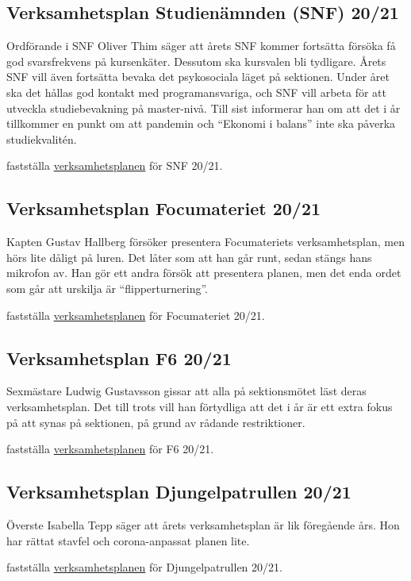 \documentclass[hidelinks]{sektionsmote}
\begin{document}
\subsection{Verksamhetsplan Studienämnden (SNF) 20/21}
Ordförande i SNF Oliver Thim säger att årets SNF kommer fortsätta försöka få god svarsfrekvens på kursenkäter.
Dessutom ska kursvalen bli tydligare.
Årets SNF vill även fortsätta bevaka det psykosociala läget på sektionen.
Under året ska det hållas god kontakt med programansvariga, och SNF vill arbeta för att utveckla studiebevakning på master-nivå.
Till sist informerar han om att det i år tillkommer en punkt om att pandemin och \enquote{Ekonomi i balans} inte ska påverka studiekvalitén.
\begin{beslut}
    \item fastställa \hyperlink{bilagor/snf/vp.pdf.1}{verksamhetsplanen} för SNF 20/21.
\end{beslut}
    
\subsection{Verksamhetsplan Focumateriet 20/21}
Kapten Gustav Hallberg försöker presentera Focumateriets verksamhetsplan, men hörs lite dåligt på luren.
Det låter som att han går runt, sedan stängs hans mikrofon av.
Han gör ett andra försök att presentera planen, men det enda ordet som går att urskilja är \enquote{flipperturnering}.
\begin{beslut}
    \item fastställa \hyperlink{bilagor/foc/vp.pdf.1}{verksamhetsplanen} för Focumateriet 20/21.
\end{beslut}

\subsection{Verksamhetsplan F6 20/21}
Sexmästare Ludwig Gustavsson gissar att alla på sektionsmötet läst deras verksamhetsplan.
Det till trots vill han förtydliga att det i år är ett extra fokus på att synas på sektionen, på grund av rådande restriktioner.
\begin{beslut}
    \item fastställa \hyperlink{bilagor/f6/vp.pdf.1}{verksamhetsplanen} för F6 20/21.
\end{beslut}

\subsection{Verksamhetsplan Djungelpatrullen 20/21}
Överste Isabella Tepp säger att årets verksamhetsplan är lik föregående års.
Hon har rättat stavfel och corona-anpassat planen lite.
\begin{beslut}
    \item fastställa \hyperlink{bilagor/pd/vp.pdf.1}{verksamhetsplanen} för Djungelpatrullen 20/21.
\end{beslut}
\end{document}

